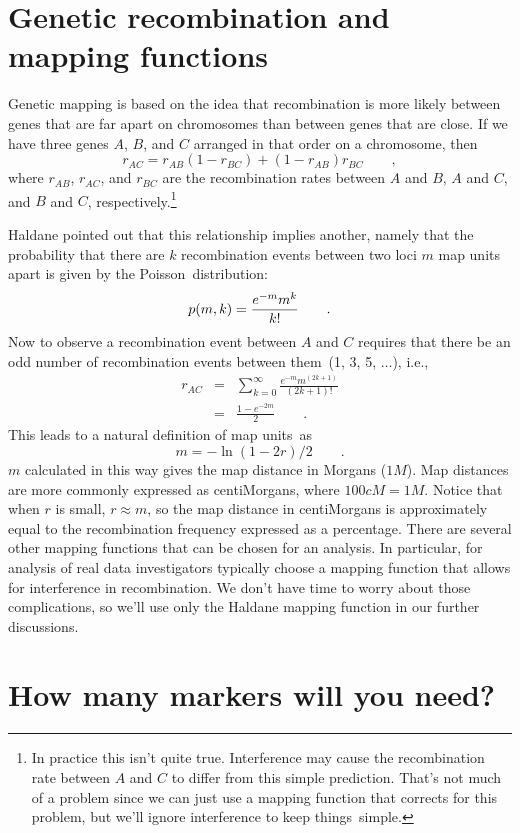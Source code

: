 \documentclass[12pt]{article}
\begin{document}
\section*{Genetic recombination and mapping functions}

Genetic mapping is based on the idea that recombination is more likely
between genes that are far apart on chromosomes than between genes
that are close. If we have three genes $A$, $B$, and $C$ arranged in
that order on a chromosome, then
\[
r_{AC} = r_{AB}(1-r_{BC}) + (1-r_{AB})r_{BC} \qquad ,
\]
where $r_{AB}$, $r_{AC}$, and $r_{BC}$ are the recombination rates
between $A$ and $B$, $A$ and $C$, and $B$ and $C$,
respectively.\footnote{In practice this isn't quite true. Interference
  may cause the recombination rate between $A$ and $C$ to differ from
  this simple prediction. That's not much of a problem since we can
  just use a mapping function that corrects for this problem, but
  we'll ignore interference to keep things~simple.}

Haldane pointed out that this relationship implies another, namely
that the probability that there are $k$ recombination events between
two loci $m$ map units apart is given by the Poisson~distribution:
\[
p(m,k) = {e^{-m} m^k \over k!} \qquad .
\]
Now to observe a recombination event between $A$ and $C$ requires that
there be an odd number of recombination events between them~(1, 3, 5,
$\ldots$), i.e.,
\begin{eqnarray*}
r_{AC} &=& \sum_{k=0}^\infty \frac{e^{-m} m^{(2k+1)}}{(2k+1)!} \\
       &=& \frac{1 - e^{-2m}}{2} \qquad .
\end{eqnarray*}
This leads to a natural definition of map units~as
\[
m = -\ln (1-2r) /2 \qquad .
\]
$m$ calculated in this way gives the map distance in Morgans
($1M$). Map distances are more commonly expressed as centiMorgans,
where $100cM = 1M$. Notice that when $r$ is small, $r \approx m$, so
the map distance in centiMorgans is approximately equal to the
recombination frequency expressed as a percentage. There are several
other mapping functions that can be chosen for an analysis. In
particular, for analysis of real data investigators typically choose a
mapping function that allows for interference in recombination. We
don't have time to worry about those complications, so we'll use only
the Haldane mapping function in our further discussions.

\section*{How many markers will you need?}
\end{document}

